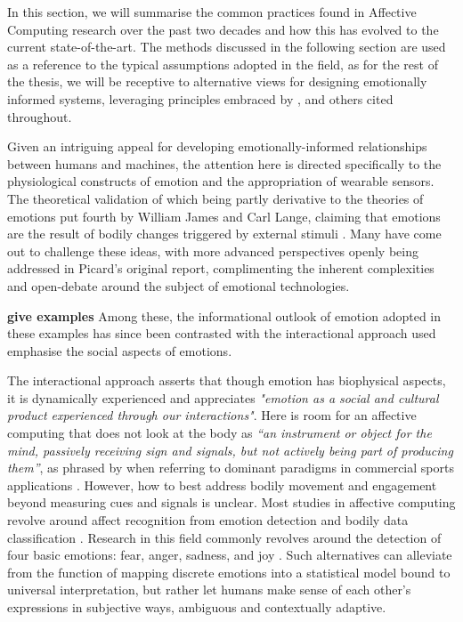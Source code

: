 In this section, we will summarise the common practices found in Affective Computing research over the past two decades and how this has evolved to the current state-of-the-art. The methods discussed in the following section are used as a reference to the typical assumptions adopted in the field, as for the rest of the thesis, we will be receptive to alternative views for designing emotionally informed systems, leveraging principles embraced by \citeauthor{hook_interactional_2008} \cite{hook_interactional_2008}, \citeauthor{barrett_functionalism_2017} \cite{barrett_functionalism_2017} and others cited throughout.

Given an intriguing appeal for developing emotionally-informed relationships between humans and machines, the attention here is directed specifically to the physiological constructs of emotion and the appropriation of wearable sensors. The theoretical validation of which being partly derivative to the theories of emotions put fourth by William James and Carl Lange, claiming that emotions are the result of bodily changes triggered by external stimuli \cite{james_principles_1890,cannon_james-lange_1927}. Many have come out to challenge these ideas, with more advanced perspectives openly being addressed in Picard's original report, complimenting the inherent complexities and open-debate around the subject of emotional technologies.

\textbf{give examples}
Among these, the informational outlook of emotion adopted in these examples has since been contrasted with the interactional approach used emphasise the social aspects of emotions.

The interactional approach asserts that though emotion has biophysical aspects, it is dynamically experienced and appreciates \textit{"emotion as a social and cultural product experienced through our interactions"}. Here is room for an affective computing that does not look at the body as \textit{“an instrument or object for the mind, passively receiving sign and signals, but not actively being part of producing them”}, as phrased by \citeauthor{hook_kristina_affective_2012} when referring to dominant paradigms in commercial sports applications \cite{hook_kristina_affective_2012}. However, how to best address bodily movement and engagement beyond measuring cues and signals is unclear. Most studies in affective computing revolve around affect recognition from emotion detection and bodily data classification \cite{bota_review_2019}. Research in this field commonly revolves around the detection of four basic emotions: fear, anger, sadness, and joy \cite{picard_mit_nodate}. Such alternatives can alleviate from the function of mapping discrete emotions into a statistical model bound to universal interpretation, but rather let humans make sense of each other's expressions in subjective ways, ambiguous and contextually adaptive.

